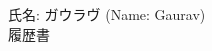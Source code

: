 ﻿\documentclass[8.5pt,a4paper,xelatex,ja=standard]{bxjsarticle}
\begin{document}
氏名: ガウラヴ (Name: Gaurav) \\
履歴書
\end{document}
